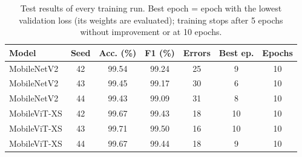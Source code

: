 \begin{table}[!t]
\centering
\scriptsize
\setlength{\tabcolsep}{3pt}
\caption{Test results of every training run. Best epoch = epoch with the lowest validation loss (its weights are evaluated); training stops after 5 epochs without improvement or at 10 epochs.}
\label{tab:perseed}
\begin{tabular}{lcccccc}
\toprule
Model & Seed & Acc. (\%) & F1 (\%) & Errors & Best ep. & Epochs \\
\midrule
MobileNetV2 & 42 & 99.54 & 99.24 & 25 & 9 & 10 \\
MobileNetV2 & 43 & 99.45 & 99.17 & 30 & 6 & 10 \\
MobileNetV2 & 44 & 99.43 & 99.09 & 31 & 8 & 10 \\
MobileViT-XS & 42 & 99.67 & 99.43 & 18 & 10 & 10 \\
MobileViT-XS & 43 & 99.71 & 99.50 & 16 & 10 & 10 \\
MobileViT-XS & 44 & 99.67 & 99.44 & 18 & 9 & 10 \\
\bottomrule
\end{tabular}
\end{table}
